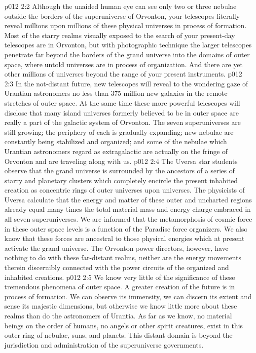 \vs p012 2:2 Although the unaided human eye can see only two or three nebulae outside the borders of the superuniverse of Orvonton, your telescopes literally reveal millions upon millions of these physical universes in process of formation. Most of the starry realms visually exposed to the search of your present\hyp{}day telescopes are in Orvonton, but with photographic technique the larger telescopes penetrate far beyond the borders of the grand universe into the domains of outer space, where untold universes are in process of organization. And there are yet other millions of universes beyond the range of your present instruments.
\vs p012 2:3 In the not\hyp{}distant future, new telescopes will reveal to the wondering gaze of Urantian astronomers no less than 375 million new galaxies in the remote stretches of outer space. At the same time these more powerful telescopes will disclose that many island universes formerly believed to be in outer space are really a part of the galactic system of Orvonton. The seven superuniverses are still growing; the periphery of each is gradually expanding; new nebulae are constantly being stabilized and organized; and some of the nebulae which Urantian astronomers regard as extragalactic are actually on the fringe of Orvonton and are traveling along with us.
\pc \vs p012 2:4 The Uversa star students observe that the grand universe is surrounded by the ancestors of a series of starry and planetary clusters which completely encircle the present inhabited creation as concentric rings of outer universes upon universes. The physicists of Uversa calculate that the energy and matter of these outer and uncharted regions already equal many times the total material mass and energy charge embraced in all seven superuniverses. We are informed that the metamorphosis of cosmic force in these outer space levels is a function of the Paradise force organizers. We also know that these forces are ancestral to those physical energies which at present activate the grand universe. The Orvonton power directors, however, have nothing to do with these far\hyp{}distant realms, neither are the energy movements therein discernibly connected with the power circuits of the organized and inhabited creations.
\pc \vs p012 2:5 We know very little of the significance of these tremendous phenomena of outer space. A greater creation of the future is in process of formation. We can observe its immensity, we can discern its extent and sense its majestic dimensions, but otherwise we know little more about these realms than do the astronomers of Urantia. As far as we know, no material beings on the order of humans, no angels or other spirit creatures, exist in this outer ring of nebulae, suns, and planets. This distant domain is beyond the jurisdiction and administration of the superuniverse governments.
